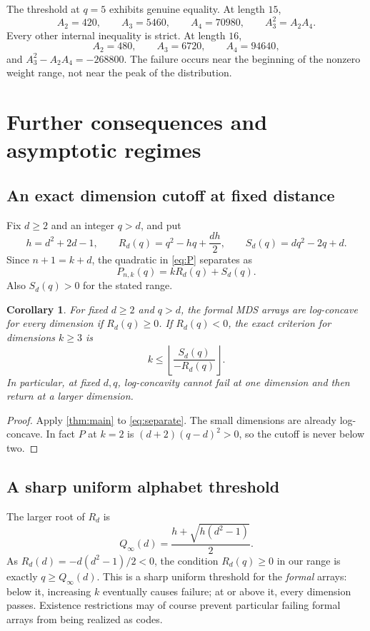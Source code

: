 \documentclass[11pt,letterpaper]{article}
\numberwithin{equation}{section}
\newtheorem{corollary}[theorem]{Corollary}
\theoremstyle{definition}
\begin{document}
The threshold at $q=5$ exhibits genuine equality. At length $15$,
\[
 A_2=420,\qquad A_3=5460,\qquad A_4=70980,
 \qquad A_3^2=A_2A_4.
\]
Every other internal inequality is strict. At length $16$,
\[
 A_2=480,\qquad A_3=6720,\qquad A_4=94640,
\]
and $A_3^2-A_2A_4=-268800$. The failure occurs near the beginning
of the nonzero weight range, not near the peak of the distribution.

\section{Further consequences and asymptotic regimes}

\subsection{An exact dimension cutoff at fixed distance}
Fix $d\ge2$ and an integer $q>d$, and put
\begin{equation}\label{eq:RS}
 h=d^2+2d-1,\qquad
 R_d(q)=q^2-hq+\frac{dh}{2},\qquad
 S_d(q)=dq^2-2q+d.
\end{equation}
Since $n+1=k+d$, the quadratic in \eqref{eq:P} separates as
\begin{equation}\label{eq:separate}
 P_{n,k}(q)=kR_d(q)+S_d(q).
\end{equation}
Also $S_d(q)>0$ for the stated range.

\begin{corollary}\label{cor:cutoff}
For fixed $d\ge2$ and $q>d$, the formal MDS arrays are log-concave
for every dimension if $R_d(q)\ge0$. If $R_d(q)<0$, the exact
criterion for dimensions $k\ge3$ is
\[
 k\le \left\lfloor\frac{S_d(q)}{-R_d(q)}\right\rfloor.
\]
In particular, at fixed $d,q$, log-concavity cannot fail at one
dimension and then return at a larger dimension.
\end{corollary}
\begin{proof}
Apply \cref{thm:main} to \eqref{eq:separate}. The small dimensions
are already log-concave. In fact $P$ at $k=2$ is
$(d+2)(q-d)^2>0$, so the cutoff is never below two.
\end{proof}

\subsection{A sharp uniform alphabet threshold}
The larger root of $R_d$ is
\begin{equation}\label{eq:qinf}
 Q_\infty(d)=\frac{h+\sqrt{h(d^2-1)}}2.
\end{equation}
As $R_d(d)=-d(d^2-1)/2<0$, the condition $R_d(q)\ge0$ in our
range is exactly $q\ge Q_\infty(d)$.
This is a sharp uniform threshold for the \emph{formal} arrays:
below it, increasing $k$ eventually causes failure; at or above it,
every dimension passes. Existence restrictions may of course prevent
particular failing formal arrays from being realized as codes.
\end{document}
